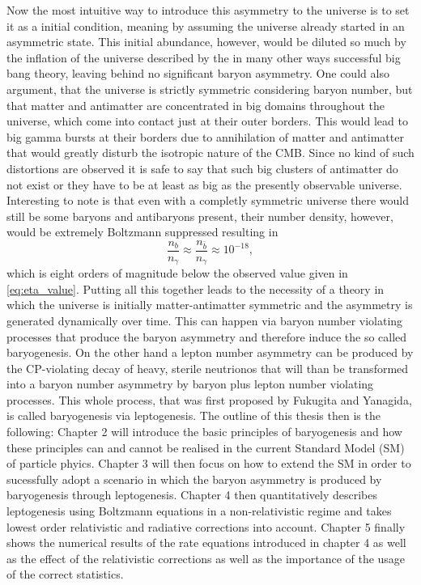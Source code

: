 Now the most intuitive way to introduce this asymmetry to the universe is to set it as a initial condition, meaning by assuming the universe already started in an asymmetric state. This initial abundance, however, would be diluted so much by the inflation of the universe described by the in many other ways successful big bang theory, leaving behind no significant baryon asymmetry. One could also argument, that the universe is strictly symmetric considering baryon number, but that matter and antimatter are concentrated in big domains throughout the universe, which come into contact just at their outer borders. This would lead to big gamma bursts at their borders due to annihilation of matter and antimatter that would greatly disturb the isotropic nature of the CMB. Since no kind of such distortions are observed it is safe to say that such big clusters of antimatter do not exist or they have to be at least as big as the presently observable universe\cite{Cline:2006ts}. Interesting to note is that even with a completly symmetric universe there would still be some baryons and antibaryons present, their number density, however, would be extremely Boltzmann suppressed resulting in
\begin{equation}
	\frac{n_b}{n_\gamma}\approx	\frac{n_{\bar{b}}}{n_\gamma}\approx10^{-18},
\end{equation}
which is eight orders of magnitude below the observed value given in \eqref{eq:eta_value}.\newline \indent
Putting all this together leads to the necessity of a theory in which the universe is initially matter-antimatter symmetric and the asymmetry is generated dynamically over time. This can happen via baryon number violating processes that produce the baryon asymmetry and therefore induce the so called baryogenesis. On the other hand a lepton number asymmetry can be produced by the CP-violating decay of heavy, sterile neutrionos that will than be transformed into a baryon number asymmetry by baryon plus lepton number violating processes. This whole process, that was first proposed by Fukugita and Yanagida\cite{Fukugita:1986hr}, is called baryogenesis via leptogenesis. \newline \indent
The outline of this thesis then is the following: Chapter 2 will introduce the basic principles of baryogenesis and how these principles can and cannot be realised in the current Standard Model (SM) of particle phyics. Chapter 3 will then focus on how to extend the SM in order to sucessfully adopt a scenario in which the baryon asymmetry is produced by baryogenesis through leptogenesis. Chapter 4 then quantitatively describes leptogenesis using Boltzmann equations in a non-relativistic regime and takes lowest order relativistic and radiative corrections into account. Chapter 5 finally shows the numerical results of the rate equations introduced in chapter 4 as well as the effect of the relativistic%
corrections as well as the importance of the usage of the correct statistics.